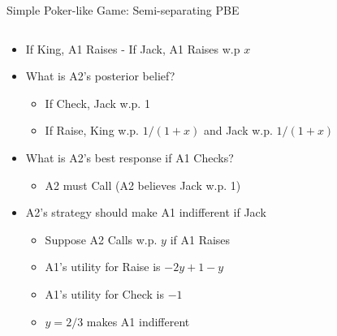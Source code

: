 \documentclass[11pt,aspectratio=169,handout]{beamer}
\begin{document}
  
  \begin{frame}{Simple Poker-like Game: Semi-separating PBE}
   \begin{columns}
    \begin{column}{0.6\textwidth}
     \begin{itemize}[<+->] \scriptsize
      \item If King, A1 Raises - If Jack, A1 Raises w.p $x$
      \item What is A2's posterior belief?
      \begin{itemize}\scriptsize
       \item If Check, Jack w.p. 1
       \item If Raise, King w.p. $1/(1+x)$ and Jack w.p. $1/(1+x)$
      \end{itemize}
      \item What is A2's best response if A1 Checks?
      \begin{itemize}\scriptsize
       \item A2 must Call (A2 believes Jack w.p. 1)
      \end{itemize}
      \item A2's strategy should make A1 indifferent if Jack
      \begin{itemize}\scriptsize
       \item Suppose A2 Calls w.p. $y$ if A1 Raises
       \item A1's utility for Raise is $-2y+1-y$
       \item A1's utility for Check is $-1$
       \item $y = 2/3$ makes A1 indifferent
      \end{itemize}
     \end{itemize}
    \end{column}
    \begin{column}{0.4\textwidth}   
     \begin{center}
\end{center}
\end{column}
\end{columns}
\end{frame}
\end{document}
